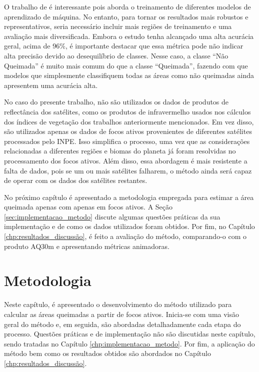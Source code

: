 \documentclass[cic,tc]{iiufrgs}
\begin{document}
O trabalho de \citet{dosclassificaccao} é interessante pois aborda o treinamento de diferentes modelos de aprendizado de máquina. No entanto, para tornar os resultados mais robustos e representativos, seria necessário incluir mais regiões de treinamento e uma avaliação mais diversificada. Embora o estudo tenha alcançado uma alta acurácia geral, acima de 96\%, é importante destacar que essa métrica pode não indicar alta precisão devido ao desequilíbrio de classes. Nesse caso, a classe ``Não Queimada'' é muito mais comum do que a classe ``Queimada'', fazendo com que modelos que simplesmente classifiquem todas as áreas como não queimadas ainda apresentem uma acurácia alta.

No caso do presente trabalho, não são utilizados os dados de produtos de reflectância dos satélites, como os produtos de infravermelho usados nos cálculos dos índices de vegetação dos trabalhos anteriormente mencionados. Em vez disso, são utilizados apenas os dados de focos ativos provenientes de diferentes satélites processados pelo INPE. Isso simplifica o processo, uma vez que as considerações relacionadas a diferentes regiões e biomas do planeta já foram resolvidas no processamento dos focos ativos. Além disso, essa abordagem é mais resistente a falta de dados, pois se um ou mais satélites falharem, o método ainda será capaz de operar com os dados dos satélites restantes. 

No próximo capítulo é apresentado a metodologia empregada para estimar a área queimada apenas com apenas em focos ativos. A Seção \ref{sec:implementacao_metodo} discute algumas questões práticas da sua implementação e de como os dados utilizados foram obtidos. Por fim, no Capítulo \ref{chp:resultados_discussão}, é feito a avaliação do método, comparando-o com o produto AQ30m e apresentando métricas animadoras.




\chapter{Metodologia}
\label{chp:metodologia}

Neste capítulo, é apresentado o desenvolvimento do método utilizado para calcular as áreas queimadas a partir de focos ativos. Inicia-se com uma visão geral do método e, em seguida, são abordadas detalhadamente cada etapa do processo. Questões práticas e de implementação não são discutidas neste capítulo, sendo tratadas no Capítulo \ref{chp:implementacao_metodo}. Por fim, a aplicação do método bem como os resultados obtidos são abordados no Capítulo \ref{chp:resultados_discussão}.
\end{document}
